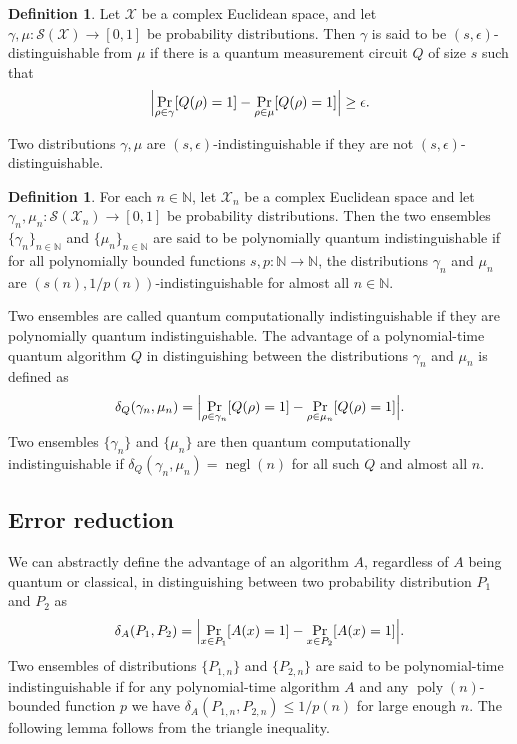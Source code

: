 \documentclass[11pt]{article}
\theoremstyle{plain}
\theoremstyle{definition}
\newtheorem{definition}[theorem]{Definition}
\DeclareMathOperator{\negl}{negl} %
\DeclareMathOperator{\poly}{poly}
\DeclarePairedDelimiter{\abs}{\lvert}{\rvert}
\def\N{\mathbb{N}}
\def\X{\mathcal{X}}
\def\SX{\mathcal{S(X)}}
\begin{document}
\begin{definition}
    Let $\X$ be a complex Euclidean space, and let $\gamma, \mu: \SX \rightarrow [0, 1]$ be probability distributions. Then $\gamma$ is said to be $(s, \epsilon)$-distinguishable from $\mu$ if there is a quantum measurement circuit $Q$ of size $s$ such that
    \[ \abs[\Big]{ \Pr_{\rho \in \gamma}[Q(\rho) = 1] - \Pr_{\rho \in \mu}[Q(\rho) = 1]} \ge \epsilon. \]
\end{definition} 

Two distributions $\gamma, \mu$ are $(s, \epsilon)$-indistinguishable if they are not $(s, \epsilon)$-distinguishable.

\begin{definition}
    For each $n \in \N$, let $\X_n$ be a complex Euclidean space and let $\gamma_n, \mu_n: \mathcal{S}(\X_n) \rightarrow [0, 1]$ be probability distributions. Then the two ensembles $\{ \gamma_n \}_{n \in \N}$ and $\{ \mu_n \}_{n \in \N}$ are said to be polynomially quantum indistinguishable if for all polynomially bounded functions $s, p: \N \rightarrow \N$, the distributions $\gamma_n$ and $\mu_n$ are $(s(n), 1 / p(n))$-indistinguishable for almost all $n \in \N$.
\end{definition}

Two ensembles are called quantum computationally indistinguishable if they are polynomially quantum indistinguishable. The advantage of a polynomial-time quantum algorithm $Q$ in distinguishing between the distributions $\gamma_n$ and $\mu_n$ is defined as
\[ \delta_Q(\gamma_n, \mu_n) = \abs[\Big]{ \Pr_{\rho \in \gamma_n}[Q(\rho) = 1] - \Pr_{\rho \in \mu_n}[Q(\rho) = 1] }. \]
Two ensembles $\{ \gamma_n \}$ and $\{ \mu_n \}$ are then quantum computationally indistinguishable if $\delta_Q(\gamma_n, \mu_n) = \negl(n)$ for all such $Q$ and almost all $n$. 




\subsection{Error reduction}
\label{sec:err-red}

We can abstractly define the advantage of an algorithm $A$, regardless of $A$ being quantum or classical, in distinguishing between two probability distribution $P_1$ and $P_2$ as
\[ \delta_A(P_1, P_2) = \abs[\Big]{ \Pr_{x \in P_1}[A(x) = 1] - \Pr_{x \in P_2}[A(x) = 1] }. \]
Two ensembles of distributions $\{ P_{1, n} \}$ and $\{ P_{2, n} \}$ are said to be polynomial-time indistinguishable if for any polynomial-time algorithm $A$ and any $\poly(n)$-bounded function $p$ we have $\delta_A(P_{1, n}, P_{2, n}) \le 1 / p(n)$ for large enough $n$. The following lemma follows from the triangle inequality.
\end{document}
